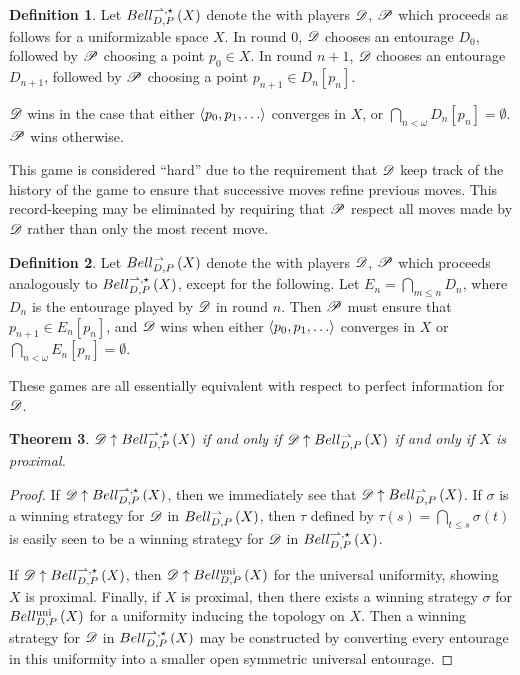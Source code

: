 \documentclass{amsart}
\newtheorem{thm}{Theorem}[section]
\theoremstyle{definition}
\newtheorem{defn}[thm]{Definition}
\begin{document}
\begin{defn}
  Let $Bell_{D,P}^{\rightharpoonup,\star}\left({X}\right)$ denote the  with
  players $\mathscr{D}$, $\mathscr{P}$ which proceeds as follows for
  a uniformizable space $X$. In round $0$,
  $\mathscr{D}$ chooses an entourage $D_0$, followed by $\mathscr{P}$
  choosing a point $p_0\in X$. In round $n+1$, $\mathscr{D}$ chooses an entourage
  $D_{n+1}$, followed by $\mathscr{P}$ choosing a point $p_{n+1}\in D_n[p_n]$.

  $\mathscr{D}$ wins in the case that either $\<p_0,p_1,\dots\>$ converges in $X$,
  or $\bigcap_{n<\omega}D_n[p_n] = \emptyset$. $\mathscr{P}$ wins otherwise.
\end{defn}

This game is considered ``hard'' due to the requirement that $\mathscr{D}$
keep track of the history of the game to ensure that successive
moves refine previous moves. This record-keeping may be eliminated by
requiring that $\mathscr{P}$ respect all moves made by $\mathscr{D}$ rather than only
the most recent move.

\begin{defn}
  Let $Bell_{D,P}^{\rightharpoonup}\left({X}\right)$ denote the  with players
  $\mathscr{D}$, $\mathscr{P}$ which proceeds analogously to $Bell_{D,P}^{\rightharpoonup,\star}\left({X}\right)$, except
  for the following. Let $E_n=\bigcap_{m\leq n}D_n$, where $D_n$ is the
  entourage played by $\mathscr{D}$ in round $n$.
  Then $\mathscr{P}$ must ensure that $p_{n+1}\in E_n[p_n]$,
  and $\mathscr{D}$ wins when either $\<p_0,p_1,\dots\>$ converges in $X$
  or $\bigcap_{n<\omega}E_n[p_n] = \emptyset$.
\end{defn}

These games are all essentially equivalent with respect to perfect
information for $\mathscr{D}$.

\begin{thm}
  $\mathscr{D}\uparrow Bell_{D,P}^{\rightharpoonup,\star}\left({X}\right)$ if and only if
  $\mathscr{D}\uparrow Bell_{D,P}^{\rightharpoonup}\left({X}\right)$ if and only if
  $X$ is proximal.
\end{thm}

\begin{proof}
  If $\mathscr{D}\uparrow Bell_{D,P}^{\rightharpoonup,\star}\left({X}\right)$, then we immediately see that
  $\mathscr{D}\uparrow Bell_{D,P}^{\rightharpoonup}\left({X}\right)$. If $\sigma$ is a winning strategy for $\mathscr{D}$
  in $Bell_{D,P}^{\rightharpoonup}\left({X}\right)$, then $\tau$ defined by
  $\tau(s)=\bigcap_{t\leq s}\sigma(t)$ is easily seen to be a winning strategy
  for $\mathscr{D}$ in $Bell_{D,P}^{\rightharpoonup,\star}\left({X}\right)$.

  If $\mathscr{D}\uparrow Bell_{D,P}^{\rightharpoonup,\star}\left({X}\right)$, then $\mathscr{D}\uparrow Bell_{D,P}^{\textrm{uni}}\left({X}\right)$
  for the universal uniformity, showing $X$ is proximal.
  Finally, if $X$ is proximal, then there exists a winning strategy $\sigma$
  for $Bell_{D,P}^{\textrm{uni}}\left({X}\right)$ for a uniformity inducing the
  topology on $X$. Then a winning strategy for $\mathscr{D}$ in $Bell_{D,P}^{\rightharpoonup,\star}\left({X}\right)$
  may be constructed by converting every entourage in this uniformity
  into a smaller open symmetric universal entourage.
\end{proof}
\end{document}
